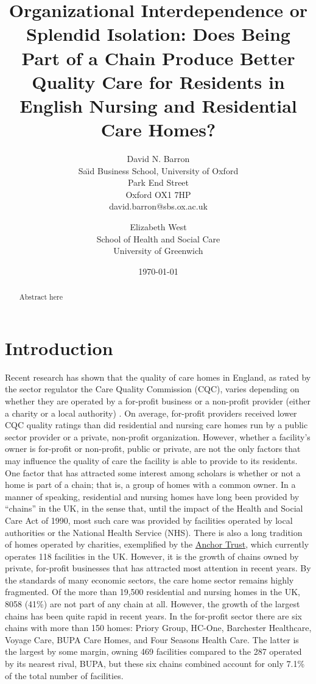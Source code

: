\documentclass[a4paper,11pt,titlepage,british]{article}
\title{Organizational Interdependence or Splendid Isolation: Does Being Part of a Chain Produce Better Quality Care for Residents in English Nursing and Residential Care Homes?}%
\author{David N. Barron\\ Sa\"{\i}d Business School, University of Oxford\\ Park End Street \\ Oxford OX1 7HP\\ david.barron@sbs.ox.ac.uk %
 \and %
 Elizabeth West \\ School of Health and Social Care\\ University of Greenwich }%
\date{\today}%
\begin{document}

\maketitle

\begin{abstract}
Abstract here
\end{abstract}


\section{Introduction}

Recent research has shown that the quality of care homes in England, as rated by the sector regulator the Care Quality Commission (CQC), varies depending on whether they are operated by a for-profit business or a non-profit provider (either a charity or a local authority) \parencite{Barron2017}.  On average, for-profit providers received lower CQC quality ratings than did residential and nursing care homes run by a public sector provider or a private, non-profit organization.  However, whether a facility's owner is for-profit or non-profit, public or private, are not the only factors that may influence the quality of care the facility is able to provide to its residents.  One factor that has attracted some interest among scholars is whether or not a home is part of a chain; that is, a group of homes with a common owner.  In a manner of speaking, residential and nursing homes have long been provided by ``chains'' in the UK, in the sense that, until the impact of the Health and Social Care Act of 1990, most such care was provided by facilities operated by local authorities or the National Health Service (NHS).  There is also a long tradition of homes operated by charities, exemplified by the \href{http://www.anchor.org.uk/}{Anchor Trust}, which currently operates 118 facilities in the UK.  However, it is the growth of chains owned by private, for-profit businesses that has attracted most attention in recent years.  By the standards of many economic sectors, the care home sector remains highly fragmented.  Of the more than 19,500 residential and nursing homes in the UK, 8058 (41\%) are not part of any chain at all.  However, the growth of the largest chains has been quite rapid in recent years.  In the for-profit sector there are six chains with more than 150 homes: Priory Group, HC-One, Barchester Healthcare, Voyage Care, BUPA Care Homes, and Four Seasons Health Care.  The latter is the largest by some margin, owning 469 facilities compared to the 287 operated by its nearest rival, BUPA, but these six chains combined account for only 7.1\% of the total number of facilities.
\end{document}
